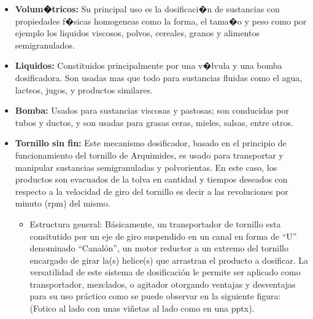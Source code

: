\begin{itemize}
\item \textbf{Volum�tricos:} Su principal uso es la dosificaci�n de sustancias con propiedades f�sicas homogeneas como la forma, el tama�o y peso como por ejemplo los liquidos viscosos, polvos, cereales, granos y alimentos semigranulados.
\item \textbf{Liquidos:} Constituidos principalmente por una v�lvula y una bomba dosificadora. Son usadas mas que todo para sustancias fluidas como el agua, lacteos, jugos, y productos similares.
\item \textbf{Bomba:} Usados para sustancias viscosas y pastosas; son conducidas por tubos y ductos, y son usadas para grasas ceras, mieles, salsas, entre otros.
\item \textbf{Tornillo sin fin:} Este mecanismo dosificador, basado en el principio de funcionamiento del tornillo de Arquimides, es usado para transportar y manipular sustancias semigranuladas y polvorientas. En este caso, los productos son evacuados de la tolva en cantidad y tiempos deseados  con respecto a la velocidad de giro del tornillo es decir a las revoluciones por minuto (rpm) del mismo.


\begin{itemize}
\item Estructura general: Básicamente, un transportador de tornillo esta consitutido por un eje de giro suspendido en un canal en forma de ``U'' denominado ``Canalón'', un motor reductor a un extremo del tornillo encargado de girar la(s) helice(s) que arrastran el producto a dosificar. La versatilidad de este sistema de dosificación le permite ser aplicado como transportador, mezclados, o agitador otorgando ventajas y desventajas para su uso práctico como se puede observar en la siguiente figura: (Fotico al lado con unas viñetas al lado como en una pptx).




\end{itemize}
\end{itemize}

